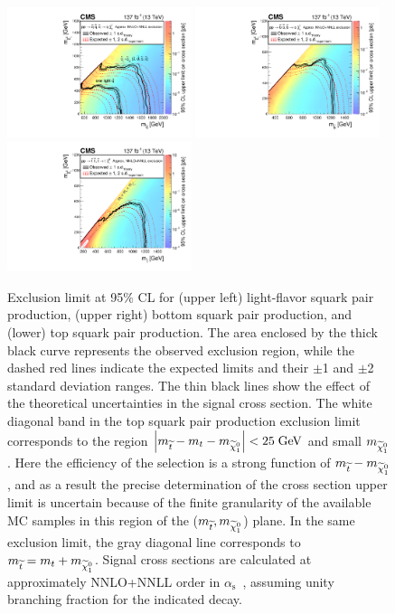 \begin{figure}[htbp]
  \centering
    \includegraphics[width=0.48\textwidth]{figs/results/T2qq_XSEC_paperXSEC.pdf}
    \includegraphics[width=0.48\textwidth]{figs/results/T2bb_XSEC_paperXSEC.pdf}
    \includegraphics[width=0.48\textwidth]{figs/results/T2tt_XSEC_paperXSEC.pdf}
    \caption{
    Exclusion limit at 95\% CL for (upper left) light-flavor squark pair production, (upper right) bottom squark pair production,
    and (lower) top squark pair production.
      The area enclosed by the thick black curve represents the observed exclusion region,
      while the dashed red lines indicate the expected limits and
      their $\pm$1 and $\pm$2
      standard deviation ranges.
      The thin black lines show the effect of the theoretical
      uncertainties in the signal cross section.
      The white diagonal band in the top squark pair production exclusion limit corresponds to the region
      $\left|m_{\widetilde{t}}-m_{t}-m_{{\widetilde{\chi}_1^0}}\right|< 25\;\text{Ge\hspace{-.08em}V}$ and small $m_{{\widetilde{\chi}_1^0}}$. Here the efficiency of the selection
      is a strong function of $m_{\widetilde{t}}-m_{{\widetilde{\chi}_1^0}}$, and as a result the precise
      determination of the cross section upper limit is uncertain
      because of the finite granularity of the available
      MC samples in this region of the ($m_{\widetilde{t}}, m_{{\widetilde{\chi}_1^0}}$)  plane. In the same exclusion limit, the gray diagonal line corresponds to $m_{\widetilde{t}}=m_{t}+m_{{\widetilde{\chi}_1^0}}$.
      Signal cross sections are calculated at approximately NNLO+NNLL order in $\alpha_{\mathrm{s}}$~\cite{Beenakker:nnll},
      assuming unity branching fraction for the indicated decay.}
    \label{fig:t2x}
\end{figure}

